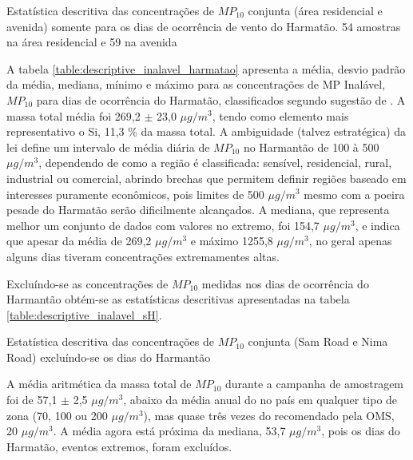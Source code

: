\begin{table}[H]
  \centering
  
  \caption{Estatística descritiva das concentrações de $MP_{10}$ conjunta
           (área residencial e avenida) somente para os dias de ocorrência 
           de vento do Harmatão. 54 amostras na área residencial e 59 na avenida 
          \label{table:descriptive_inalavel_harmatao}}
\end{table}

A tabela \ref{table:descriptive_inalavel_harmatao} apresenta a média, 
desvio padrão da média, mediana, mínimo e máximo para as concentrações de 
MP Inalável, $MP_{10}$ para dias de ocorrência do Harmatão, classificados
segundo sugestão de \citet{aboh2009}. A massa total média foi 269,2 $\pm$ 23,0
$\mu g/ m^3$, tendo como elemento mais representativo o Si, 11,3 \% da massa total. 
A ambiguidade (talvez estratégica) da lei define um intervalo de média diária 
de $MP_{10}$ no Harmantão de 100 à 500 $\mu g/ m^3$, dependendo de como a região
é classificada: sensível, residencial, rural, industrial ou comercial, abrindo
brechas que permitem definir regiões baseado em interesses puramente econômicos,
pois limites de 500 $\mu g/ m^3$ mesmo com a poeira pesade do Harmatão serão
dificilmente alcançados. A mediana, que representa melhor um conjunto de dados
com valores no extremo, foi 154,7 $\mu g/ m^3$, e indica que apesar da média 
de 269,2 $\mu g/ m^3$ e máximo 1255,8 $\mu g/ m^3$, no geral apenas alguns
dias tiveram concentrações extremamentes altas. 

Excluíndo-se as concentrações de $MP_{10}$ medidas nos dias de 
ocorrência do Harmantão obtém-se as estatísticas descritivas apresentadas na 
tabela \ref{table:descriptive_inalavel_sH}.

\begin{table}[H]
  \centering
    
  \caption{Estatística descritiva das concentrações de $MP_{10}$ conjunta 
           (Sam Road e Nima Road) excluíndo-se os dias do Harmantão
            \label{table:descriptive_inalavel_sH}}
\end{table}

A média aritmética da massa total de $MP_{10}$ durante a campanha de amostragem 
foi de 57,1 $\pm$ 2,5 $\mu g/ m^3$, abaixo da média 
anual do no país em qualquer tipo de zona (70, 100 ou 200 $\mu g/ m^3$), 
mas quase três vezes do recomendado pela OMS, 20 $\mu g/m^3$.
A média agora está próxima da mediana, 53,7 $\mu g/ m^3$, 
pois os dias do Harmatão, eventos extremos, foram excluídos. 

